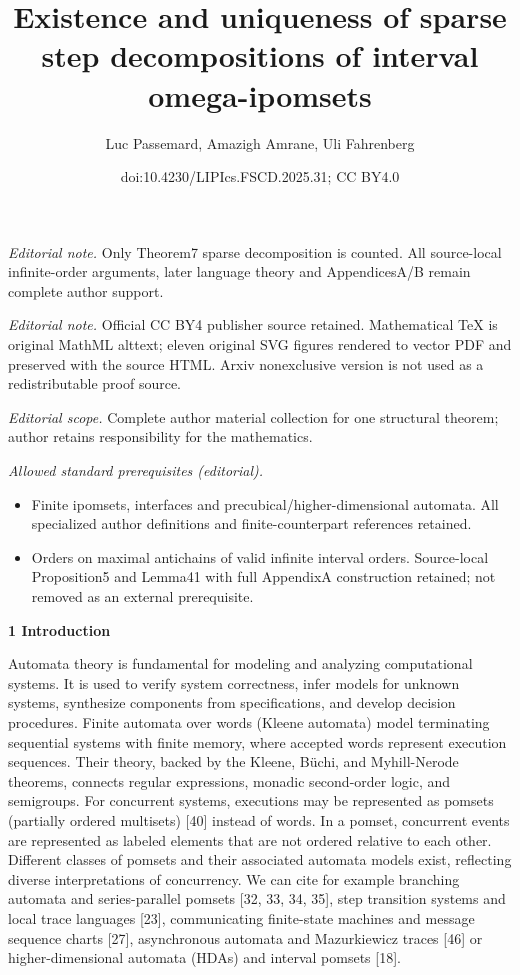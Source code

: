 \documentclass[10pt,a4paper]{article}
\title{Existence and uniqueness of sparse step decompositions of interval omega-ipomsets}
\author{Luc Passemard, Amazigh Amrane, Uli Fahrenberg}
\date{doi:10.4230/LIPIcs.FSCD.2025.31; CC BY4.0}
\begin{document}
\maketitle
\noindent\textit{Editorial note.} Only Theorem7 sparse decomposition is counted. All source-local infinite-order arguments, later language theory and AppendicesA/B remain complete author support.\par\medskip
\noindent\textit{Editorial note.} Official CC BY4 publisher source retained. Mathematical TeX is original MathML alttext; eleven original SVG figures rendered to vector PDF and preserved with the source HTML. Arxiv nonexclusive version is not used as a redistributable proof source.\par\medskip
\noindent\textit{Editorial scope.} Complete author material collection for one structural theorem; author retains responsibility for the mathematics.\par\medskip
\noindent\textit{Allowed standard prerequisites (editorial).}\begin{itemize}
\item Finite ipomsets, interfaces and precubical/higher-dimensional automata. All specialized author definitions and finite-counterpart references retained.
\item Orders on maximal antichains of valid infinite interval orders. Source-local Proposition5 and Lemma41 with full AppendixA construction retained; not removed as an external prerequisite.
\end{itemize}\medskip

 
\par\medskip\noindent\textbf{1 Introduction}\par
 
 
Automata theory is fundamental for modeling and analyzing computational systems. It is used to verify system correctness, infer models for unknown systems, synthesize components from specifications, and develop decision procedures. Finite automata over words (Kleene automata) model terminating sequential systems with finite memory, where accepted words represent execution sequences. Their theory, backed by the Kleene, Büchi, and Myhill-Nerode theorems, connects regular expressions, monadic second-order logic, and semigroups. For concurrent systems, executions may be represented as pomsets (partially ordered multisets) [40] instead of words. In a pomset, concurrent events are represented as labeled elements that are not ordered relative to each other. Different classes of pomsets and their associated automata models exist, reflecting diverse interpretations of concurrency. We can cite for example branching automata and series-parallel pomsets [32, 33, 34, 35], step transition systems and local trace languages [23], communicating finite-state machines and message sequence charts [27], asynchronous automata and Mazurkiewicz traces [46] or higher-dimensional automata (HDAs) and interval pomsets [18].\par
 
\end{document}
